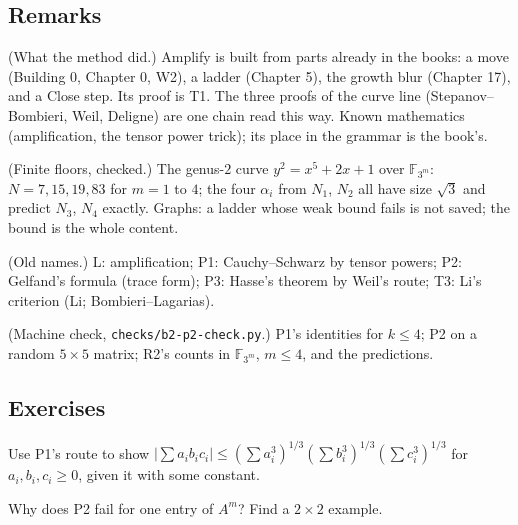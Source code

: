 \subsection*{Remarks}

\begin{lines}
\item[\lab{R1}] (What the method did.) Amplify is built from parts already in the books: a move (Building 0, Chapter 0, W2), a ladder (Chapter 5), the growth blur (Chapter 17), and a Close step. Its proof is T1. The three proofs of the curve line (Stepanov--Bombieri, Weil, Deligne) are one chain read this way. Known mathematics (amplification, the tensor power trick); its place in the grammar is the book's.
\item[\lab{R2}] (Finite floors, checked.) The genus-$2$ curve $y^2 = x^5 + 2x + 1$ over $\mathbb{F}_{3^m}$: $N = 7, 15, 19, 83$ for $m = 1$ to $4$; the four $\alpha_i$ from $N_1$, $N_2$ all have size $\sqrt3$ and predict $N_3$, $N_4$ exactly. Graphs: a ladder whose weak bound fails is not saved; the bound is the whole content.
\item[\lab{R3}] (Old names.) L: amplification; P1: Cauchy--Schwarz by tensor powers; P2: Gelfand's formula (trace form); P3: Hasse's theorem by Weil's route; T3: Li's criterion (Li; Bombieri--Lagarias).
\item[\lab{R4}] (Machine check, \texttt{checks/b2-p2-check.py}.) P1's identities for $k \le 4$; P2 on a random $5 \times 5$ matrix; R2's counts in $\mathbb{F}_{3^m}$, $m \le 4$, and the predictions.
\end{lines}

\subsection*{Exercises}

\begin{lines}
\item[\lab{E1}] Use P1's route to show $|\sum a_i b_i c_i| \le (\sum a_i^3)^{1/3} (\sum b_i^3)^{1/3} (\sum c_i^3)^{1/3}$ for $a_i, b_i, c_i \ge 0$, given it with some constant.
\item[\lab{E2}] Why does P2 fail for one entry of $A^m$? Find a $2 \times 2$ example.
\end{lines}

\newpage

